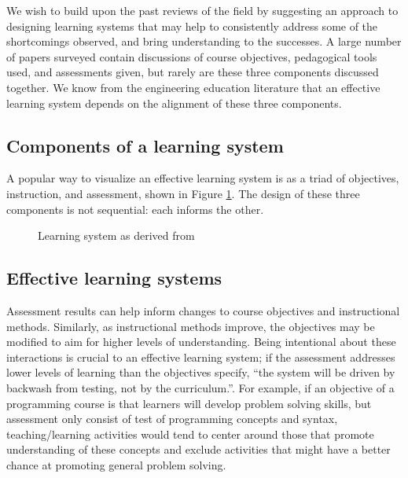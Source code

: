 \documentclass[12pt]{article}
\begin{document}
We wish to build upon the past reviews of the field by suggesting an
approach to designing learning systems that may help to consistently
address some of the shortcomings observed, and bring understanding to
the successes. A large number of papers surveyed contain discussions
of course objectives, pedagogical tools used, and assessments given,
but rarely are these three components discussed together. We know from
the engineering education literature that an effective learning system
depends on the alignment of these three
components\autocite{jamieson_creating_2009,pellegrino_rethinking_2006}.

\subsection{Components of a learning
system}\label{sec:components-of-a-learning-system}

A popular way to visualize an effective learning system is as a triad
of objectives, instruction, and
assessment\autocite{felder_designing_2003}, shown in Figure
\ref{fig:learning-system}. The design of these three components is not
sequential: each informs the other.

\begin{figure}[h!]
  \centering
  \caption{Learning system as derived from
    \citeauthor{felder_designing_2003}\autocite{felder_designing_2003}}
  \label{fig:learning-system}
\end{figure}

\subsection{Effective learning systems}\label{sec:effective-learning-systems}

Assessment results can help inform changes to course objectives and
instructional methods\autocite{felder_designing_2003}. Similarly, as
instructional methods improve, the objectives may be modified to aim
for higher levels of understanding. Being intentional about these
interactions is crucial to an effective learning system; if the
assessment addresses lower levels of learning than the objectives
specify, ``the system will be driven by backwash from testing, not by
the curriculum.''\autocite[][p. 350]{biggs_enhancing_1996}. For
example, if an objective of a programming course is that learners will
develop problem solving skills, but assessment only consist of test of
programming concepts and syntax, teaching/learning activities would
tend to center around those that promote understanding of these
concepts and exclude activities that might have a better chance at
promoting general problem solving\autocite{biggs_enhancing_1996}.
\end{document}
